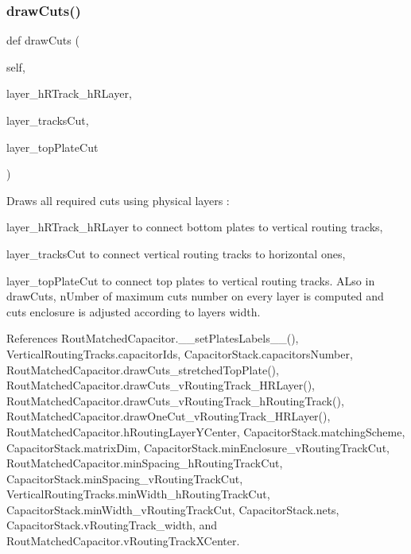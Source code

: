 \subsubsection{\texorpdfstring{draw\+Cuts()}{drawCuts()}}
{\footnotesize\ttfamily def draw\+Cuts (\begin{DoxyParamCaption}\item[{}]{self,  }\item[{}]{layer\+\_\+h\+R\+Track\+\_\+h\+R\+Layer,  }\item[{}]{layer\+\_\+tracks\+Cut,  }\item[{}]{layer\+\_\+top\+Plate\+Cut }\end{DoxyParamCaption})}



Draws all required cuts using physical layers \+: 


\begin{DoxyItemize}
\item {\ttfamily layer\+\_\+h\+R\+Track\+\_\+h\+R\+Layer} to connect bottom plates to vertical routing tracks,
\item {\ttfamily layer\+\_\+tracks\+Cut} to connect vertical routing tracks to horizontal ones,
\item {\ttfamily layer\+\_\+top\+Plate\+Cut} to connect top plates to vertical routing tracks. A\+Lso in {\ttfamily draw\+Cuts}, n\+Umber of maximum cuts number on every layer is computed and cuts enclosure is adjusted according to layer\textquotesingle{}s width. 
\end{DoxyItemize}

References Rout\+Matched\+Capacitor.\+\_\+\+\_\+set\+Plates\+Labels\+\_\+\+\_\+(), Vertical\+Routing\+Tracks.\+capacitor\+Ids, Capacitor\+Stack.\+capacitors\+Number, Rout\+Matched\+Capacitor.\+draw\+Cuts\+\_\+stretched\+Top\+Plate(), Rout\+Matched\+Capacitor.\+draw\+Cuts\+\_\+v\+Routing\+Track\+\_\+\+H\+R\+Layer(), Rout\+Matched\+Capacitor.\+draw\+Cuts\+\_\+v\+Routing\+Track\+\_\+h\+Routing\+Track(), Rout\+Matched\+Capacitor.\+draw\+One\+Cut\+\_\+v\+Routing\+Track\+\_\+\+H\+R\+Layer(), Rout\+Matched\+Capacitor.\+h\+Routing\+Layer\+Y\+Center, Capacitor\+Stack.\+matching\+Scheme, Capacitor\+Stack.\+matrix\+Dim, Capacitor\+Stack.\+min\+Enclosure\+\_\+v\+Routing\+Track\+Cut, Rout\+Matched\+Capacitor.\+min\+Spacing\+\_\+h\+Routing\+Track\+Cut, Capacitor\+Stack.\+min\+Spacing\+\_\+v\+Routing\+Track\+Cut, Vertical\+Routing\+Tracks.\+min\+Width\+\_\+h\+Routing\+Track\+Cut, Capacitor\+Stack.\+min\+Width\+\_\+v\+Routing\+Track\+Cut, Capacitor\+Stack.\+nets, Capacitor\+Stack.\+v\+Routing\+Track\+\_\+width, and Rout\+Matched\+Capacitor.\+v\+Routing\+Track\+X\+Center.



